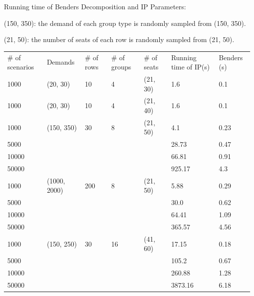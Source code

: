 \begin{frame}{Running time of Benders Decomposition and IP}
  Parameters: 

  (150, 350): the demand of each group type is randomly sampled from (150, 350).

  (21, 50): the number of seats of each row is randomly sampled from (21, 50).
  \tiny
  \begin{table}[ht]
    \centering
    \begin{tabular}{|l|l|l|l|l|l|l|}
    \hline
    \# of scenarios & Demands & \# of rows & \# of groups & \# of seats & Running time of IP(s) & Benders (s) \\
    1000 & (20, 30) & 10 & 4 & (21, 30) & 1.6 & 0.1 \\
    1000 & (20, 30) & 10 & 4 & (21, 40) & 1.6 & 0.1 \\
    \hline
    1000  & (150, 350) & 30 & 8 & (21, 50) & 4.1  & 0.23 \\
    5000  &            &    &   &         & 28.73 & 0.47  \\
    10000 &            &    &   &         & 66.81  & 0.91 \\
    50000 &            &    &   &         & 925.17 & 4.3 \\
    \hline
    1000  & (1000, 2000) & 200 & 8 & (21, 50) & 5.88 & 0.29 \\
    5000  &              &     &   &          & 30.0 & 0.62 \\
    10000 &              &     &   &          & 64.41 & 1.09 \\
    50000 &              &     &   &          & 365.57 & 4.56\\
    \hline
    1000  & (150, 250) & 30 & 16 & (41, 60) & 17.15  & 0.18 \\
    5000  &            &    &    &          & 105.2  & 0.67 \\
    10000 &            &    &    &          & 260.88 & 1.28 \\
    50000 &            &    &    &          & 3873.16 & 6.18 \\
    \hline
    \end{tabular}
  \end{table}
\end{frame}
